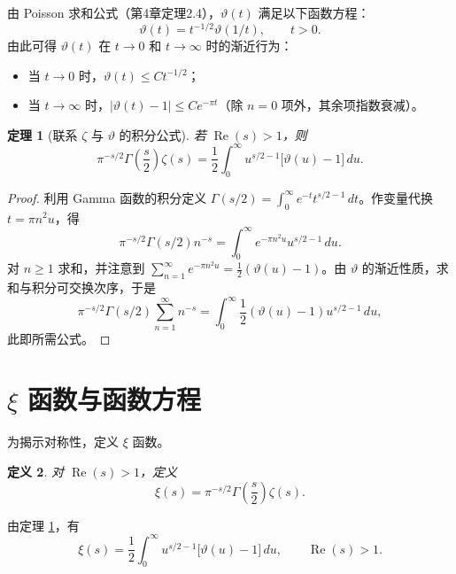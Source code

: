 \documentclass[UTF8]{ctexart}
\newtheorem{theorem}{定理}[section]
\newtheorem{definition}[theorem]{定义}
\numberwithin{equation}{section}
\begin{document}
由 Poisson 求和公式（第4章定理2.4），$\vartheta(t)$ 满足以下函数方程：
\begin{equation}\label{eq:ThetaFuncEq}
\vartheta(t) = t^{-1/2} \vartheta(1/t), \qquad t>0.
\end{equation}
由此可得 $\vartheta(t)$ 在 $t\to0$ 和 $t\to\infty$ 时的渐近行为：
\begin{itemize}
\item 当 $t\to0$ 时，$\vartheta(t) \le C t^{-1/2}$；
\item 当 $t\to\infty$ 时，$|\vartheta(t)-1| \le C e^{-\pi t}$（除 $n=0$ 项外，其余项指数衰减）。
\end{itemize}

\begin{theorem}[联系 $\zeta$ 与 $\vartheta$ 的积分公式]\label{thm:ZetaThetaIntegral}
若 $\operatorname{Re}(s)>1$，则
\begin{equation}\label{eq:ZetaIntegral}
\pi^{-s/2} \Gamma\!\left(\frac{s}{2}\right) \zeta(s)
= \frac{1}{2} \int_{0}^{\infty} u^{s/2 - 1} \bigl[\vartheta(u) - 1\bigr] \, du.
\end{equation}
\end{theorem}

\begin{proof}
利用 Gamma 函数的积分定义 $\Gamma(s/2) = \int_{0}^{\infty} e^{-t} t^{s/2 - 1}\, dt$。作变量代换 $t = \pi n^{2} u$，得
\[
\pi^{-s/2} \Gamma(s/2) n^{-s} = \int_{0}^{\infty} e^{-\pi n^{2} u} u^{s/2 - 1}\, du.
\]
对 $n\ge 1$ 求和，并注意到 $\sum_{n=1}^{\infty} e^{-\pi n^{2} u} = \frac{1}{2}(\vartheta(u)-1)$。由 $\vartheta$ 的渐近性质，求和与积分可交换次序，于是
\[
\pi^{-s/2} \Gamma(s/2) \sum_{n=1}^{\infty} n^{-s}
= \int_{0}^{\infty} \frac{1}{2} (\vartheta(u)-1) u^{s/2 - 1}\, du,
\]
此即所需公式。
\end{proof}

\section{$\xi$ 函数与函数方程}

为揭示对称性，定义 $\xi$ 函数。

\begin{definition}
对 $\operatorname{Re}(s)>1$，定义
\begin{equation}\label{eq:XiDef}
\xi(s) = \pi^{-s/2} \Gamma\!\left(\frac{s}{2}\right) \zeta(s).
\end{equation}
\end{definition}

由定理 \ref{thm:ZetaThetaIntegral}，有
\[
\xi(s) = \frac{1}{2} \int_{0}^{\infty} u^{s/2 - 1} \bigl[\vartheta(u) - 1\bigr] \, du, \qquad \operatorname{Re}(s)>1.
\]
\end{document}
